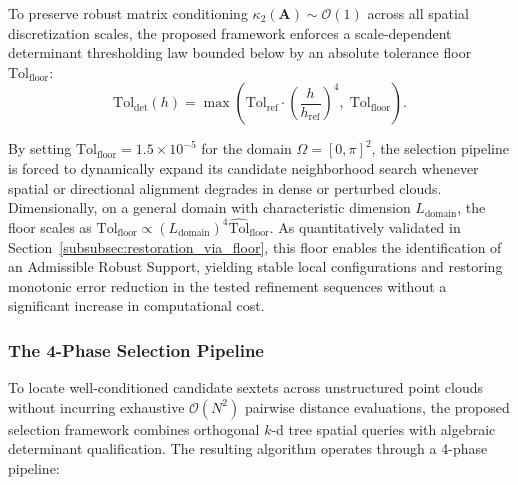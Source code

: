 \documentclass[preprint,12pt]{elsarticle}
\begin{document}
To preserve robust matrix conditioning $\kappa_2(\mathbf{A}) \sim \mathcal{O}(1)$ across all spatial discretization scales, the proposed framework enforces a scale-dependent determinant thresholding law bounded below by an absolute tolerance floor $\mathrm{Tol}_{\mathrm{floor}}$:
\begin{equation}
\mathrm{Tol}_{\mathrm{det}}(h) = \max \left( \mathrm{Tol}_{\mathrm{ref}} \cdot \left( \frac{h}{h_{\mathrm{ref}}} \right)^4, \; \mathrm{Tol}_{\mathrm{floor}} \right).
\label{eq:scale_dependent_determinant_floor}
\end{equation}

By setting $\mathrm{Tol}_{\mathrm{floor}} = 1.5 \times 10^{-5}$ for the domain $\Omega = [0, \pi]^2$, the selection pipeline is forced to dynamically expand its candidate neighborhood search whenever spatial or directional alignment degrades in dense or perturbed clouds. Dimensionally, on a general domain with characteristic dimension $L_{\mathrm{domain}}$, the floor scales as $\mathrm{Tol}_{\mathrm{floor}} \propto (L_{\mathrm{domain}})^4 \widehat{\mathrm{Tol}}_{\mathrm{floor}}$. As quantitatively validated in Section~\ref{subsubsec:restoration_via_floor}, this floor enables the identification of an Admissible Robust Support, yielding stable local configurations and restoring monotonic error reduction in the tested refinement sequences without a significant increase in computational cost.

\subsubsection{The 4-Phase Selection Pipeline}
\label{subsec:4phase_pipeline}

To locate well-conditioned candidate sextets across unstructured point clouds without incurring exhaustive $\mathcal{O}(N^2)$ pairwise distance evaluations, the proposed selection framework combines orthogonal $k$-d tree spatial queries \cite{bentley1975multidimensional,parreira2006efficient,fasshauer2007meshfree,goncalves2025tese} with algebraic determinant qualification. The resulting algorithm operates through a 4-phase pipeline:
\end{document}
